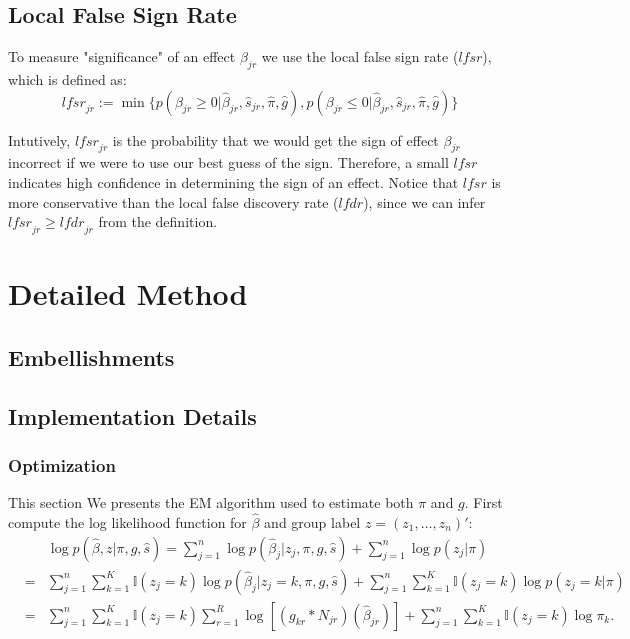 \documentclass[11pt]{article}
\def\lfdr{\textit{lfdr}}
\def\lfsr{\textit{lfsr}}
\begin{document}
\subsection{Local False Sign Rate}

To measure "significance" of an effect $\beta_{jr}$ we use the local false sign rate ($\lfsr$), which is defined as:
\begin{equation}
    \lfsr_{jr} := \min\{p(\beta_{jr}\geq 0|\hat\beta_{jr},\hat s_{jr},\hat\pi,\hat g), p(\beta_{jr}\leq 0|\hat\beta_{jr},\hat s_{jr},\hat\pi,\hat g)\}
\end{equation}

Intutively, $\lfsr_{jr}$ is the probability that we would get the sign of effect $\beta_{jr}$ incorrect if we were to use our best guess of the sign. Therefore, a small $\lfsr$ indicates high confidence in determining the sign of an effect. Notice that $\lfsr$ is more conservative than the local false discovery rate ($\lfdr$), since we can infer $\lfsr_{jr}\geq\lfdr_{jr}$ from the definition. 

\section{Detailed Method}

\subsection{Embellishments}

\subsection{Implementation Details} \label{sec:detail}

\subsubsection{Optimization}
This section We presents the EM algorithm used to estimate both $\pi$ and $g$. First compute the log likelihood function for $\hat\beta$ and group label $z=(z_1,\ldots,z_n)'$:
\begin{eqnarray}
    &&\log p(\hat\beta,z|\pi,g,\hat s) = \sum_{j=1}^n\log p(\hat\beta_j|z_j,\pi,g,\hat s)+\sum_{j=1}^n\log p(z_j|\pi) \nonumber\\
    &=& \sum_{j=1}^n\sum_{k=1}^K\mathbb{I}(z_j=k)\log p(\hat\beta_j|z_j=k,\pi,g,\hat s)
    +\sum_{j=1}^n\sum_{k=1}^K\mathbb{I}(z_j=k)\log p(z_j=k|\pi)\nonumber\\
    &=& \sum_{j=1}^n\sum_{k=1}^K\mathbb{I}(z_j=k)\sum_{r=1}^R\log \left[(g_{kr}*N_{jr})(\hat\beta_{jr}) \right]+\sum_{j=1}^n\sum_{k=1}^K\mathbb{I}(z_j=k)\log\pi_k.
\end{eqnarray}
\end{document}
